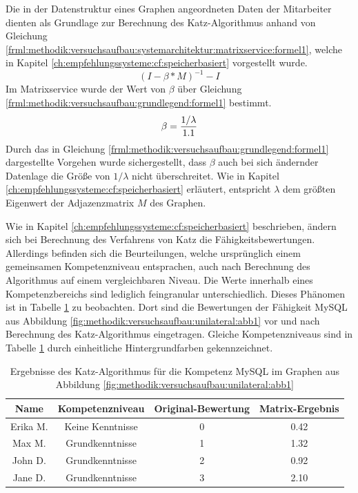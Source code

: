 Die in der Datenstruktur eines Graphen angeordneten Daten der Mitarbeiter dienten als Grundlage zur Berechnung des Katz-Algorithmus anhand von Gleichung \ref{frml:methodik:versuchsaufbau:systemarchitektur:matrixservice:formel1}, welche in Kapitel \ref{ch:empfehlungssysteme:cf:speicherbasiert} vorgestellt wurde.
\begin{equation}
	(I - \beta * M)^{-1} - I
	\label{frml:methodik:versuchsaufbau:systemarchitektur:matrixservice:formel1}
\end{equation}
Im Matrixservice wurde der Wert von $\beta$ über Gleichung \ref{frml:methodik:versuchsaufbau:grundlegend:formel1} bestimmt.
\begin{equation}
	\beta = \frac{1/\lambda}{1.1}
	\label{frml:methodik:versuchsaufbau:grundlegend:formel1}
\end{equation}
Durch das in Gleichung \ref{frml:methodik:versuchsaufbau:grundlegend:formel1} dargestellte Vorgehen wurde sichergestellt, dass $\beta$ auch bei sich ändernder Datenlage die Größe von $1/\lambda$ nicht überschreitet. Wie in Kapitel \ref{ch:empfehlungssysteme:cf:speicherbasiert} erläutert, entspricht $\lambda$ dem größten Eigenwert der Adjazenzmatrix $M$ des Graphen.%

Wie in Kapitel \ref{ch:empfehlungssysteme:cf:speicherbasiert} beschrieben, ändern sich bei Berechnung des Verfahrens von Katz die Fähigkeitsbewertungen. Allerdings befinden sich die Beurteilungen, welche ursprünglich einem gemeinsamen Kompetenzniveau entsprachen, auch nach Berechnung des Algorithmus auf einem vergleichbaren Niveau. Die Werte innerhalb eines Kompetenzbereichs sind lediglich feingranular unterschiedlich. Dieses Phänomen ist in Tabelle \ref{tbl:methodik:versuchsaufbau:unilateral:tbl1} zu beobachten. Dort sind die Bewertungen der Fähigkeit MySQL aus Abbildung \ref{fig:methodik:versuchsaufbau:unilateral:abb1} vor und nach Berechnung des Katz-Algorithmus eingetragen. Gleiche Kompetenzniveaus sind in Tabelle \ref{tbl:methodik:versuchsaufbau:unilateral:tbl1} durch einheitliche Hintergrundfarben gekennzeichnet.

\begin{table}[h]
	\centering
	\begin{tabular}{c|c|c|c}
		\textbf{Name} & \textbf{Kompetenzniveau} & \textbf{Original-Bewertung} & \textbf{Matrix-Ergebnis} \\
		\hline
		\rowcolor{exxetagray}Erika M. & Keine Kenntnisse & 0 & 0.42\\
		\hline
		\rowcolor{itemcolor}Max M.    & Grundkenntnisse  & 1 & 1.32\\
		\rowcolor{itemcolor}John D.   & Grundkenntnisse  & 2 & 0.92\\
		\rowcolor{itemcolor}Jane D.   & Grundkenntnisse  & 3 & 2.10
	\end{tabular}
	\caption{Ergebnisse des Katz-Algorithmus für die Kompetenz MySQL im Graphen aus Abbildung \ref{fig:methodik:versuchsaufbau:unilateral:abb1}}
	\label{tbl:methodik:versuchsaufbau:unilateral:tbl1}
\end{table}

